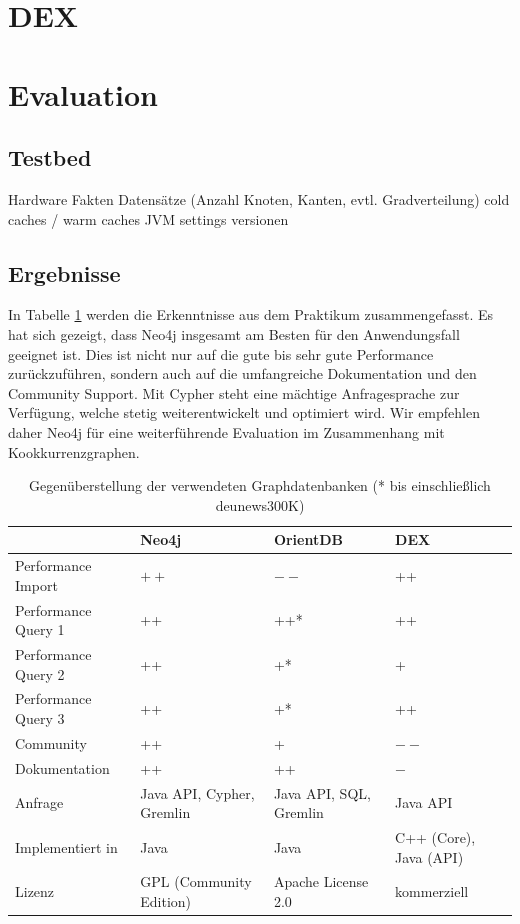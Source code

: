 \documentclass[11pt, a4paper, oneside]{article} %
\begin{document}
\section{DEX}

\section{Evaluation}

\subsection{Testbed}

Hardware Fakten
Datensätze (Anzahl Knoten, Kanten, evtl. Gradverteilung)
cold caches / warm caches
JVM settings
versionen

\subsection{Ergebnisse}

In Tabelle \ref{tab:compare} werden die Erkenntnisse aus dem Praktikum zusammengefasst. Es hat sich gezeigt, dass Neo4j insgesamt am Besten für den Anwendungsfall geeignet ist. Dies ist nicht nur auf die gute bis sehr gute Performance zurückzuführen, sondern auch auf die umfangreiche Dokumentation und den Community Support. Mit Cypher steht eine mächtige Anfragesprache zur Verfügung, welche stetig weiterentwickelt und optimiert wird. Wir empfehlen daher Neo4j für eine weiterführende Evaluation im Zusammenhang mit Kookkurrenzgraphen.

\renewcommand{\arraystretch}{1.5}

\begin{table}[ht]
\begin{tabular}{|l||p{2.5cm}|p{2.5cm}|p{2.5cm}|}
\hline 
 & \textbf{Neo4j} & \textbf{OrientDB} & \textbf{DEX} \\ 
\hline
Performance Import & $++$ & $--$ & ++ \\ 
\hline 
Performance Query 1 & ++ & ++* & ++ \\ 
\hline 
Performance Query 2 & ++ & +* & + \\ 
\hline 
Performance Query 3 & ++ & +* & ++ \\ 
\hline
Community & ++ & + & $--$ \\ 
\hline 
Dokumentation & ++ & ++ & $-$ \\
\hline 
Anfrage & Java API, Cypher, Gremlin & Java API, SQL, Gremlin & Java API \\
\hline
Implementiert in & Java & Java & C++ (Core), Java (API) \\
\hline 
Lizenz & GPL (Community Edition) & Apache License 2.0 & kommerziell	 \\ 
\hline 
\end{tabular}
\caption{Gegenüberstellung der verwendeten Graphdatenbanken (* bis einschließlich deu\textunderscore news\textunderscore 300K)}
\label{tab:compare}
\end{table}
\end{document}
